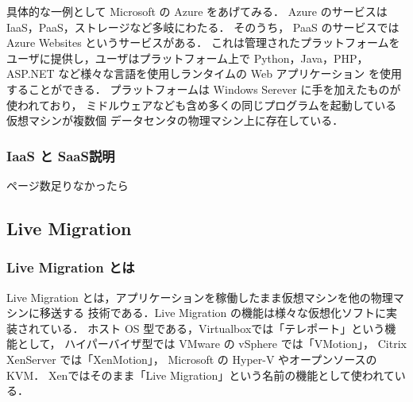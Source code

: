 \documentclass[graduation-thesis]{mlarticle}
\begin{document}
具体的な一例として Microsoft の Azure\cite{azure} をあげてみる．
Azure のサービスは IaaS，PaaS，ストレージなど多岐にわたる．
そのうち， PaaS のサービスでは Azure Websites というサービスがある．
これは管理されたプラットフォームをユーザに提供し，ユーザはプラットフォーム上で
Python，Java，PHP，ASP.NET など様々な言語を使用しランタイムの Web アプリケーション
を使用することができる．
プラットフォームは Windows Serever に手を加えたものが使われており，
ミドルウェアなども含め多くの同じプログラムを起動している仮想マシンが複数個
データセンタの物理マシン上に存在している．

\subsubsection{IaaS と SaaS説明}
\label{sec-2-2-3}
ページ数足りなかったら
\subsection{Live Migration}
\label{sec-2-3}
\subsubsection{Live Migration とは}
\label{sec-2-3-1}
Live Migration とは，アプリケーションを稼働したまま仮想マシンを他の物理マシンに移送する
技術である．Live Migration の機能は様々な仮想化ソフトに実装されている．
ホスト OS 型である，Virtualbox\cite{virtualbox}では「テレポート」という機能として，
ハイパーバイザ型では VMware の vSphere\cite{vsphere} では「VMotion」，
Citrix XenServer\cite{xenserver} では「XenMotion」，
Microsoft の Hyper-V\cite{hyper-v} やオープンソースの KVM\cite{kvm}．
Xen\cite{xen}ではそのまま「Live Migration」という名前の機能として使われている．
\end{document}
